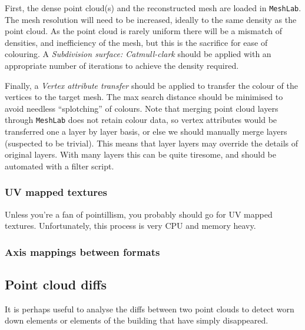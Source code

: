 First, the dense point cloud(s) and the reconstructed mesh are loaded in {\tt MeshLab}. The mesh resolution will need to be increased, ideally to the same density as the point cloud. As the point cloud is rarely uniform there will be a mismatch of densities, and inefficiency of the mesh, but this is the sacrifice for ease of colouring. A \emph{Subdivision surface: Catmull-clark} should be applied with an appropriate number of iterations to achieve the density required.

Finally, a \emph{Vertex attribute transfer} should be applied to transfer the colour of the vertices to the target mesh. The max search distance should be minimised to avoid needless ``splotching'' of colours. Note that merging point cloud layers through {\tt MeshLab} does not retain colour data, so vertex attributes would be transferred one a layer by layer basis, or else we should manually merge layers (suspected to be trivial). This means that layer layers may override the details of original layers. With many layers this can be quite tiresome, and should be automated with a filter script.

\subsubsection{UV mapped textures}

Unless you're a fan of pointillism, you probably should go for UV mapped textures. Unfortunately, this process is very CPU and memory heavy.

\subsubsection{Axis mappings between formats}

\subsection{Point cloud diffs}
It is perhaps useful to analyse the diffs between two point clouds to detect worn down elements or elements of the building that have simply disappeared.


